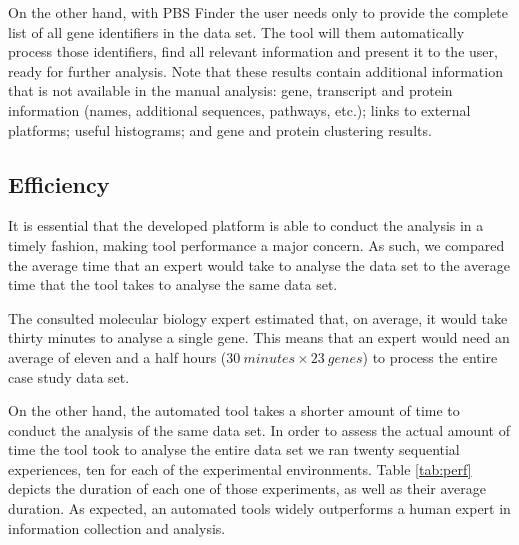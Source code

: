 On the other hand, with PBS Finder the user needs only to provide the complete
list of all gene identifiers in the data set. The tool will them automatically
process those identifiers, find all relevant information and present it to the
user, ready for further analysis. Note that these results contain additional
information that is not available in the manual analysis: gene, transcript and
protein information (names, additional sequences, pathways, etc.); links to
external platforms; useful histograms; and gene and protein clustering results.

\subsection{Efficiency}

It is essential that the developed platform is able to conduct the analysis in a
timely fashion, making tool performance a major concern. As such, we compared
the average time that an expert would take to analyse the data set to the
average time that the tool takes to analyse the same data set.

The consulted molecular biology expert estimated that, on average, it would take
thirty minutes to analyse a single gene. This means that an expert would need an
average of eleven and a half hours ($30\ minutes \times 23\ genes$) to process the
entire case study data set.

On the other hand, the automated tool takes a shorter amount of time to conduct
the analysis of the same data set. In order to assess the actual amount of time
the tool took to analyse the entire data set we ran twenty sequential
experiences, ten for each of the experimental environments. Table \ref{tab:perf}
depicts the duration of each one of those experiments, as well as their average
duration. As expected, an automated tools widely outperforms a human expert in
information collection and analysis.

